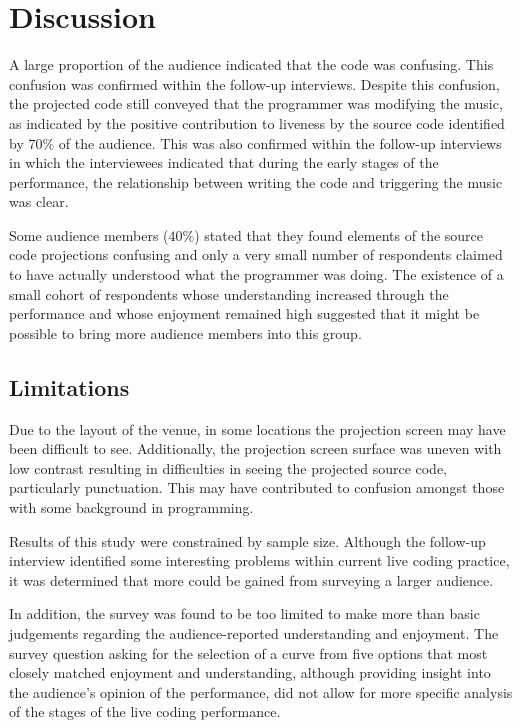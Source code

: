 \section{Discussion}

A large proportion of the audience indicated that the code was confusing. This confusion was confirmed within the follow-up interviews. Despite this confusion, the projected code still conveyed that the programmer was modifying the music, as indicated by the positive contribution to liveness by the source code identified by $70\%$ of the audience. This was also confirmed within the follow-up interviews in which the interviewees indicated that during the early stages of the performance, the relationship between writing the code and triggering the music was clear.

Some audience members ($40\%$) stated that they found elements of the source code projections confusing and only a very small number of respondents claimed to have actually understood what the programmer was doing. The existence of a small cohort of respondents whose understanding increased through the performance and whose enjoyment remained high suggested that it might be possible to bring more audience members into this group.

\subsection{Limitations}

Due to the layout of the venue, in some locations the projection screen may have been difficult to see. Additionally, the projection screen surface was uneven with low contrast resulting in difficulties in seeing the projected source code, particularly punctuation. This may have contributed to confusion amongst those with some background in programming.

Results of this study were constrained by sample size. Although the follow-up interview identified some interesting problems within current live coding practice, it was determined that more could be gained from surveying a larger audience.

In addition, the survey was found to be too limited to make more than basic judgements regarding the audience-reported understanding and enjoyment. The survey question asking for the selection of a curve from five options that most closely matched enjoyment and understanding, although providing insight into the audience's opinion of the performance, did not allow for more specific analysis of the stages of the live coding performance.

